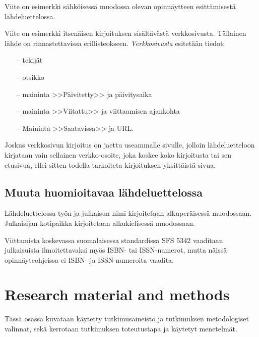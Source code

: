 \documentclass[english, 12pt, a4paper, elec, utf8, a-1b, online]{aaltothesis}
\begin{document}
Viite \cite{Adida} on esimerkki s\"ahk\"oisess\"a muodossa olevan
opinn\"aytteen esitt\"amisest\"a l\"ahdeluettelossa.

Viite \cite{viittaaminen} on esimerkki itsen\"aisen kirjoituksen sis\"alt\"av\"ast\"a
verkkosivusta. T\"allainen l\"ahde on rinnastettavissa erillisteokseen.
\textit{Verkkosivusta} esitet\"a\"an tiedot:

\begin{itemize}
\item[--] tekij\"at
\item[--] otsikko
\item[--] maininta >>P\"aivitetty>> ja p\"aivitysaika 
\item[--] maininta >>Viitattu>> ja viittaamisen ajankohta
\item[--] Maininta >>Saatavissa>> ja URL.
\end{itemize}

Joskus verkkosivun kirjoitus on jaettu useammalle sivulle, jolloin
l\"ahdeluetteloon kirjataan vain sellainen verkko-osoite, joka koskee
koko kirjoitusta tai sen etusivua, ellei sitten 
todella tarkoiteta kirjoituksen yksitt\"aist\"a sivua. 

\subsection*{Muuta huomioitavaa l\"ahdeluettelossa}

L\"ahdeluettelossa ty\"on ja julkaisun nimi kirjoitetaan alkuper\"aisess\"a
muodossaan. Julkaisijan kotipaikka kirjoitetaan alkukielisess\"a
muodossaan.

Viittamista koskevassa suomalaisessa standardissa
SFS 5342 \cite{sfs} vaaditaan julkaisuista ilmoitettavaksi my\"os ISBN- tai
ISSN-numerot, mutta n\"aiss\"a opinn\"ayteohjeissa ei ISBN- ja 
ISSN-numeroita vaadita. 

\clearpage

\section{Research material and methods}

T\"ass\"a osassa kuvataan k\"aytetty tutkimusaineisto ja
tutkimuksen metodologiset valinnat, sek\"a
kerrotaan tutkimuksen toteutustapa ja k\"aytetyt menetelm\"at. 
\end{document}
